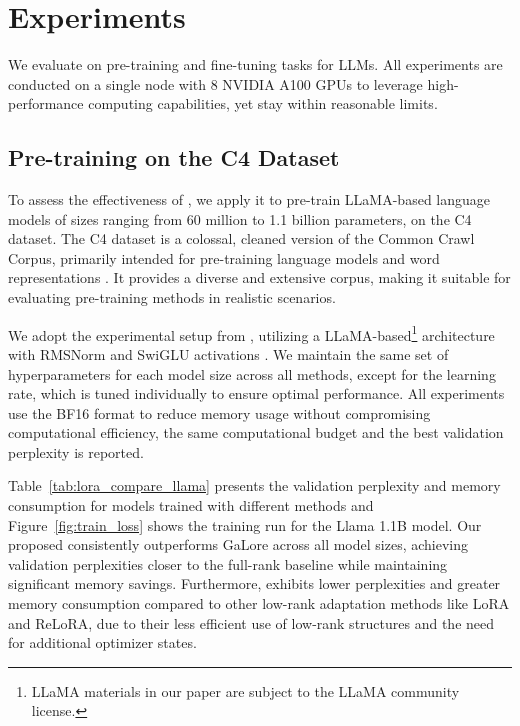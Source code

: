 \section{Experiments}

We evaluate \textit{\lowrank} on pre-training and fine-tuning tasks for LLMs. All experiments are conducted on a single node with 8 NVIDIA A100 GPUs to leverage high-performance computing capabilities, yet stay within reasonable limits.

\subsection{Pre-training on the C4 Dataset}

To assess the effectiveness of \textit{\lowrank}, we apply it to pre-train LLaMA-based language models of sizes ranging from 60 million to 1.1 billion parameters, on the C4 dataset. The C4 dataset is a colossal, cleaned version of the Common Crawl Corpus, primarily intended for pre-training language models and word representations \citep{raffelExploringLimitsTransfer2020}. It provides a diverse and extensive corpus, making it suitable for evaluating pre-training methods in realistic scenarios.

We adopt the experimental setup from \citet{lialinReLoRAHighRankTraining2023}, utilizing a LLaMA-based\footnote[2]{LLaMA materials in our paper are subject to the LLaMA community license.} architecture with RMSNorm and SwiGLU activations \citep{shazeerGLUVariantsImprove2020,touvronLlamaOpenFoundation2023}. We maintain the same set of hyperparameters for each model size across all methods, except for the learning rate, which is tuned individually to ensure optimal performance. All experiments use the BF16 format to reduce memory usage without compromising computational efficiency, the same computational budget and the best validation perplexity is reported.





Table~\ref{tab:lora_compare_llama} presents the validation perplexity and memory consumption for models trained with different methods and Figure~\ref{fig:train_loss} shows the training run for the Llama 1.1B model. Our proposed \textit{\lowrank} consistently outperforms GaLore \citep{zhao2024galore} across all model sizes, achieving validation perplexities closer to the full-rank baseline while maintaining significant memory savings. Furthermore, \textit{\lowrank} exhibits lower perplexities and greater memory consumption compared to other low-rank adaptation methods like LoRA and ReLoRA, due to their less efficient use of low-rank structures and the need for additional optimizer states.

